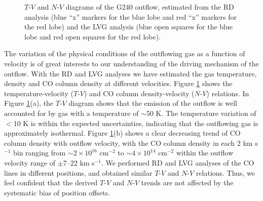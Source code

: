 \begin{figure}[!tbp]
\caption{$T$-$V$ and $N$-$V$ diagrams of the G240 outflow, estimated from the RD analysis (blue ``x'' markers for the blue lobe and red ``x'' markers for the red lobe) and the LVG analysis (blue open squares for the blue lobe and red open squares for the red lobe). \label{fig:figrelation}}
\end{figure}

The variation of the physical conditions of the outflowing gas as a function of velocity is of great interests to our understanding of the driving mechanism of the outflow. With the RD and LVG analyses we have estimated the gas temperature, density and CO column density at different velocities. Figure \ref{fig:figrelation} shows the temperature-velocity ($T$-$V$) and CO column density-velocity ($N$-$V$) relations. In Figure \ref{fig:figrelation}(a), the $T$-$V$ diagram shows that the emission of the outflow is well accounted for by gas with a temperature of $\sim$50 K. The temperature variation of $<$10 K is within the expected uncertainties, indicating that the outflowing gas is approximately isothermal. Figure \ref{fig:figrelation}(b) shows a clear decreasing trend of CO column density with outflow velocity, with the CO column density in each 2 km s$^{-1}$ bin ranging from $\sim 2 \times 10^{16} $ cm$^{-2}$ to $\sim 4 \times 10^{14}$ cm$^{-2}$ within the outflow velocity range of $\pm$7--22 km s$^{-1}$. We performed RD and LVG analyses of the CO lines in different positions, and obtained similar $T$-$V$ and $N$-$V$ relations. Thus, we feel confident that the derived $T$-$V$ and $N$-$V$ trends are not affected by the systematic bias of position offsets.

